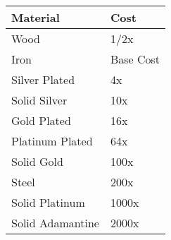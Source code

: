 \begin{normbox}

\small
\begin{tabular}{@{}l l}
\textbf{Material} & \textbf{Cost}\\
\midrule
Wood  & 1/2x\\
Iron  & Base Cost\\
Silver Plated  & 4x\\
Solid Silver  & 10x\\
Gold Plated  & 16x\\
Platinum Plated  & 64x\\
Solid Gold  & 100x\\
Steel  & 200x\\
Solid Platinum  & 1000x\\
Solid Adamantine  & 2000x\\
\end{tabular}
\end{normbox}

